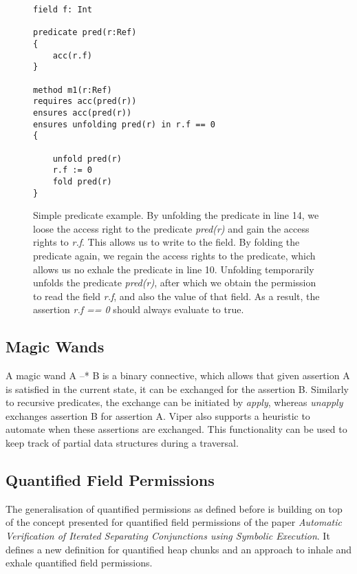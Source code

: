 \documentclass[12pt]{article}
\begin{document}
\begin{figure}[h]
  \centering
\begin{lstlisting}
field f: Int

predicate pred(r:Ref)
{
    acc(r.f)
}

method m1(r:Ref)
requires acc(pred(r))
ensures acc(pred(r))
ensures unfolding pred(r) in r.f == 0
{

    unfold pred(r)
    r.f := 0
    fold pred(r)
}
\end{lstlisting}
\caption[predicate example]
   {Simple predicate example. By unfolding the predicate in line 14, we loose the access right to the predicate \textit{pred(r)} and gain the access rights to \textit{r.f}. This allows us to write to the field. By folding the predicate again, we regain the access rights to the predicate, which allows us no exhale the predicate in line 10. Unfolding temporarily unfolds the predicate \textit{pred(r)}, after which we obtain the permission to read the field \textit{r.f}, and also the value of that field. As a result, the assertion \textit{r.f == 0} should always evaluate to true.}
\end{figure}

\subsection{Magic Wands}
A magic wand\cite{magicwand} A --* B is a binary connective, which allows that given assertion A is satisfied in the current state, it can be exchanged for the assertion B. Similarly to recursive predicates, the exchange can be initiated by \textit{apply}, whereas \textit{unapply} exchanges assertion B for assertion A. Viper also supports a heuristic to automate when these assertions are exchanged. This functionality can be used to keep track of partial data structures during a traversal.


\subsection{Quantified Field Permissions}
The generalisation of quantified permissions as defined before is building on top of the concept presented for quantified field permissions of the paper \textit{Automatic Verification of Iterated Separating Conjunctions using Symbolic Execution}\cite{isc}.
It defines a new definition for quantified heap chunks and an approach to inhale and exhale quantified field permissions.
\end{document}
